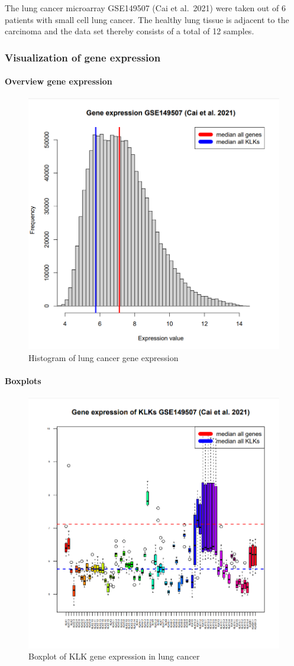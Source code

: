 \documentclass[
]{article}
\begin{document}
The lung cancer microarray GSE149507 (Cai et al.~2021) were taken out of
6 patients with small cell lung cancer. The healthy lung tissue is
adjacent to the carcinoma and the data set thereby consists of a total
of 12 samples.

\hypertarget{visualization-of-gene-expression-1}{%
\subsubsection{Visualization of gene
expression}\label{visualization-of-gene-expression-1}}

\hypertarget{overview-gene-expression-1}{%
\paragraph{Overview gene expression}\label{overview-gene-expression-1}}

\begin{figure}

{\centering \includegraphics[width=0.5\linewidth]{images/Histogram_lung} 

}

\caption{Histogram of lung cancer gene expression}\label{fig:Histogram - lung }
\end{figure}

\hypertarget{boxplots-1}{%
\paragraph{Boxplots}\label{boxplots-1}}

\begin{figure}

{\centering \includegraphics[width=0.5\linewidth]{images/Boxplot_lung} 

}

\caption{Boxplot of KLK gene expression in lung cancer}\label{fig:Boxplot - lung }
\end{figure}
\end{document}
